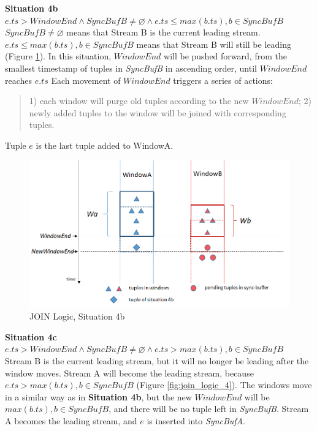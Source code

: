 \documentclass[a4paper, 11pt, twoside]{report}
\let\emptyset\varnothing
\begin{document}
\noindent\textbf{Situation 4b} $e.ts>WindowEnd \wedge SyncBufB\neq \emptyset \wedge e.ts\leq max(b.ts), b \in SyncBufB$\\

$SyncBufB\neq \emptyset$ means that Stream B is the current leading stream. $e.ts\leq max(b.ts), b \in SyncBufB$ means that Stream B will still be leading (Figure \ref{fig:join_logic_3}). In this situation, $WindowEnd$ will be pushed forward, from the smallest timestamp of tuples in \textit{SyncBufB} in ascending order, until $WindowEnd$ reaches $e.ts$ Each movement of $WindowEnd$ triggers a series of actions:

\begin{quote}
1) each window will purge old tuples according to the new $WindowEnd$;
2) newly added tuples to the window will be joined with corresponding tuples.
\end{quote}

Tuple $e$ is the last tuple added to WindowA.\\

\begin{figure}[h]
\centering
\includegraphics[scale=0.55]{join_logic_3}
\caption{JOIN Logic, Situation 4b\label{fig:join_logic_3}}
\end{figure}

\noindent\textbf{Situation 4c} $e.ts>WindowEnd \wedge SyncBufB\neq \emptyset \wedge e.ts> max(b.ts), b \in SyncBufB$\\

Stream B is the current leading stream, but it will no longer be leading after the window moves. Stream A will become the leading stream, because $e.ts> max(b.ts), b \in SyncBufB$ (Figure \ref{fig:join_logic_4}). The windows move in a similar way as in \textbf{Situation 4b}, but the new $WindowEnd$ will be $max(b.ts), b \in SyncBufB$, and there will be no tuple left in \textit{SyncBufB}. Stream A becomes the leading stream, and $e$ is inserted into \textit{SyncBufA}.\\
\end{document}
